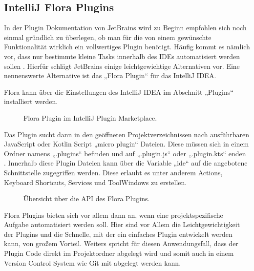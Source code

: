 \subsection{IntelliJ Flora Plugins}

In der Plugin Dokumentation von JetBrains wird zu Beginn 
empfohlen sich noch einmal gründlich zu überlegen, ob man 
für die von einem gewünschte Funktionalität wirklich ein 
vollwertiges Plugin benötigt. Häufig kommt es nämlich vor, 
dass nur bestimmte kleine Tasks innerhalb des IDEs 
automatisiert werden sollen \cite{IntelliJSDKDocumentation}. Hierfür schlägt JetBrains 
einige leichtgewichtige Alternativen vor. Eine nennenswerte 
Alternative ist das „Flora Plugin“ für das IntelliJ IDEA. 

Flora kann über die Einstellungen des IntelliJ IDEA 
im Abschnitt „Plugins“ installiert werden.

\begin{figure}
    \centering
    \caption{Flora Plugin im IntelliJ Plugin Marketplace.}
    \label{fig:FloraPlugin}
\end{figure}    
 
Das Plugin sucht dann in den geöffneten Projektverzeichnissen
nach ausführbaren JavaScript oder Kotlin Script „micro plugin“ 
Dateien. Diese müssen sich in einem Ordner namens „.plugins“ 
befinden und auf „.plugin.js“ oder „.plugin.kts“ enden \cite{FloraPluginMarketplace}.
Innerhalb diese Plugin Dateien kann über die Variable „ide“ auf 
die angebotene Schnittstelle zugegriffen werden. Diese erlaubt 
es unter anderem Actions, Keyboard Shortcuts, Services und 
ToolWindows zu erstellen.

\begin{figure}
    \centering
    \caption{Übersicht über die API des Flora Plugins.}
    \label{fig:FloraPluginAPI}
\end{figure}    
 
Flora Plugins bieten sich vor allem dann an, wenn eine projektspezifische 
Aufgabe automatisiert werden soll. Hier sind vor Allem die 
Leichtgewichtigkeit der Plugins und die Schnelle, mit der ein 
einfaches Plugin entwickelt werden kann, von großem Vorteil. 
Weiters spricht für diesen Anwendungsfall, dass der Plugin Code 
direkt im Projektordner abgelegt wird und somit auch in einem Version 
Control System wie Git mit abgelegt werden kann.

